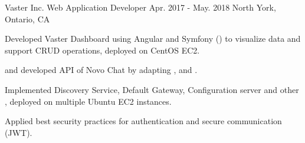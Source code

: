 \begin{cventries}
  \cventry
    {Vaster Inc.} %
    {Web Application Developer} %
    {Apr. 2017 - May. 2018} %
    {North York, Ontario, CA} %
    {
      \begin{cvitems} %
        \item {Developed Vaster Dashboard using Angular and Symfony () to visualize data and support CRUD operations, deployed on CentOS EC2.}
        \item { and developed  API of Novo Chat by adapting ,  and .}
          \begin{cvsubitems}
            \item {Implemented Discovery Service, Default Gateway, Configuration server and other , deployed on multiple Ubuntu EC2 instances.}
          \end{cvsubitems}
        \item {Applied best security practices for authentication and  secure communication (JWT).}
      \end{cvitems}
    }

\end{cventries}
